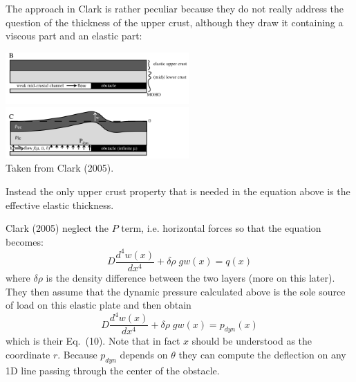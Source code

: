 The approach in Clark \etal is rather peculiar because they do not really address the question of the thickness
of the upper crust, although they draw it containing a viscous part and an elastic part:
\begin{center}
\includegraphics[width=7cm]{python_codes/fieldstone_108/images/clbr05d1}
\includegraphics[width=7cm]{python_codes/fieldstone_108/images/clbr05d2}\\
{\captionfont  Taken from Clark \etal (2005). }
\end{center}
Instead the only upper crust property that is needed in the equation above is the effective elastic thickness. 



Clark \etal (2005) neglect the $P$ term, i.e. horizontal forces so that the equation becomes:
\[
D \frac{d^4w(x)}{dx^4} + \delta\!\rho \; g w(x) = q(x)
\]
where $\delta\rho$ is the density difference between the two layers (more on this later). 
They then assume that the dynamic pressure calculated above is the sole source of load on this elastic plate and then obtain 
\[
D \frac{d^4w(x)}{dx^4} + \delta\!\rho \; g w(x) = p_{dyn}(x)
\]
which is their Eq.~(10). Note that in fact $x$ should be understood as the coordinate $r$. Because $p_{dyn}$ depends on $\theta$ they can compute the deflection on any 1D line passing through the center of the obstacle. 

